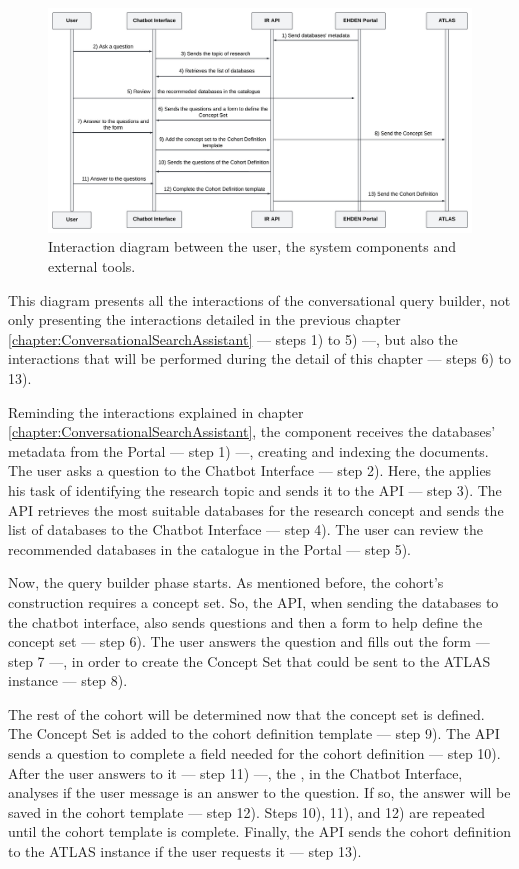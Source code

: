\begin{figure}[H]
  \includegraphics[width=\textwidth]{figs/chapter4/interaction_diagram1.png}
  \centering
  \caption{Interaction diagram between the user, the system components and external tools.}
  \label{fig_interaction}
\end{figure}

This diagram presents all the interactions of the conversational query builder, not only presenting the interactions detailed in the previous chapter \ref{chapter:ConversationalSearchAssistant} — steps 1) to 5) —, but also the interactions that will be performed during the detail of this chapter — steps 6) to 13).

Reminding the interactions explained in chapter \ref{chapter:ConversationalSearchAssistant}, the {\ir} component receives the databases' metadata from the {\ehden} Portal — step 1) —, creating and indexing the documents. The user asks a question to the Chatbot Interface — step 2). Here, the {\llm} applies his task of identifying the research topic and sends it to the {\ir} API — step 3). The {\ir} API retrieves the most suitable databases for the research concept and sends the list of databases to the Chatbot Interface — step 4). The user can review the recommended databases in the catalogue in the {\ehden} Portal — step 5). 

Now, the query builder phase starts. As mentioned before, the cohort's construction requires a concept set. So, the {\ir} API, when sending the databases to the chatbot interface, also sends questions and then a form to help define the concept set — step 6). The user answers the question and fills out the form — step 7 —, in order to create the Concept Set that could be sent to the ATLAS instance — step 8). 

The rest of the cohort will be determined now that the concept set is defined. The Concept Set is added to the cohort definition template  — step 9). The {\ir} API sends a question to complete a field needed for the cohort definition  — step 10). After the user answers to it  — step 11) —, the {\llm}, in the Chatbot Interface, analyses if the user message is an answer to the question. If so, the answer will be saved in the cohort template — step 12). Steps 10), 11), and 12) are repeated until the cohort template is complete. Finally, the {\ir} API sends the cohort definition to the ATLAS instance if the user requests it — step 13).


